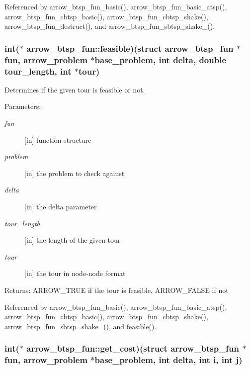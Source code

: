 Referenced by arrow\_\-btsp\_\-fun\_\-basic(), arrow\_\-btsp\_\-fun\_\-basic\_\-atsp(), arrow\_\-btsp\_\-fun\_\-cbtsp\_\-basic(), arrow\_\-btsp\_\-fun\_\-cbtsp\_\-shake(), arrow\_\-btsp\_\-fun\_\-destruct(), and arrow\_\-btsp\_\-fun\_\-sbtsp\_\-shake\_().\hypertarget{structarrow__btsp__fun_39eb61a5ad9a5786e773cce4affd2150}{
\subsubsection[{feasible}]{\setlength{\rightskip}{0pt plus 5cm}int($\ast$ {\bf arrow\_\-btsp\_\-fun::feasible})(struct {\bf arrow\_\-btsp\_\-fun} $\ast$fun, {\bf arrow\_\-problem} $\ast$base\_\-problem, int delta, double tour\_\-length, int $\ast$tour)}}
\label{structarrow__btsp__fun_39eb61a5ad9a5786e773cce4affd2150}


Determines if the given tour is feasible or not. 

\begin{Desc}
\item[Parameters:]
\begin{description}
\item[{\em fun}]\mbox{[}in\mbox{]} function structure \item[{\em problem}]\mbox{[}in\mbox{]} the problem to check against \item[{\em delta}]\mbox{[}in\mbox{]} the delta parameter \item[{\em tour\_\-length}]\mbox{[}in\mbox{]} the length of the given tour \item[{\em tour}]\mbox{[}in\mbox{]} the tour in node-node format \end{description}
\end{Desc}
\begin{Desc}
\item[Returns:]ARROW\_\-TRUE if the tour is feasible, ARROW\_\-FALSE if not \end{Desc}


Referenced by arrow\_\-btsp\_\-fun\_\-basic(), arrow\_\-btsp\_\-fun\_\-basic\_\-atsp(), arrow\_\-btsp\_\-fun\_\-cbtsp\_\-basic(), arrow\_\-btsp\_\-fun\_\-cbtsp\_\-shake(), arrow\_\-btsp\_\-fun\_\-sbtsp\_\-shake\_(), and feasible().\hypertarget{structarrow__btsp__fun_56eb57e90eae76571a024894bd0fe570}{
\subsubsection[{get\_\-cost}]{\setlength{\rightskip}{0pt plus 5cm}int($\ast$ {\bf arrow\_\-btsp\_\-fun::get\_\-cost})(struct {\bf arrow\_\-btsp\_\-fun} $\ast$fun, {\bf arrow\_\-problem} $\ast$base\_\-problem, int delta, int i, int j)}}
\label{structarrow__btsp__fun_56eb57e90eae76571a024894bd0fe570}


